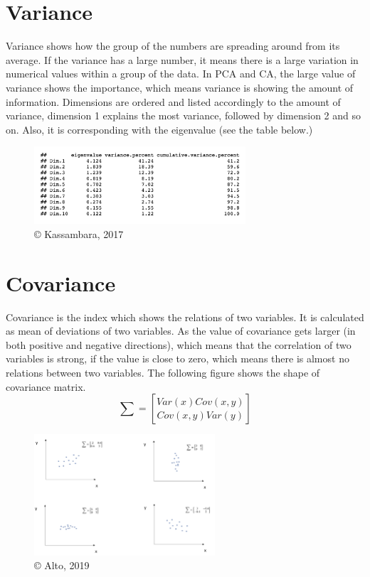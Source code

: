 \documentclass[]{book}
\begin{document}
\hypertarget{variance}{%
\section{Variance}\label{variance}}

Variance shows how the group of the numbers are spreading around from its average.
If the variance has a large number, it means there is a large variation in numerical values within a group of the data. In PCA and CA, the large value of variance shows the importance, which means variance is showing the amount of information. Dimensions are ordered and listed accordingly to the amount of variance, dimension 1 explains the most variance, followed by dimension 2 and so on. Also, it is corresponding with the eigenvalue (see the table below.)

\begin{figure}
\centering
\includegraphics[width=0.7\textwidth,height=\textheight]{eigenvariance.png}
\caption{© Kassambara, 2017}
\end{figure}

\hypertarget{covariance}{%
\section{Covariance}\label{covariance}}

Covariance is the index which shows the relations of two variables. It is calculated as mean of deviations of two variables. As the value of covariance gets larger (in both positive and negative directions), which means that the correlation of two variables is strong, if the value is close to zero, which means there is almost no relations between two variables.
The following figure shows the shape of covariance matrix.
\[
{\sum =} \genfrac[]{0pt}{2}{Var(x) Cov(x,y)}{Cov(x,y) Var(y)} 
\]

\begin{figure}
\centering
\includegraphics[width=0.6\textwidth,height=\textheight]{covariance.png}
\caption{© Alto, 2019}
\end{figure}
\end{document}
